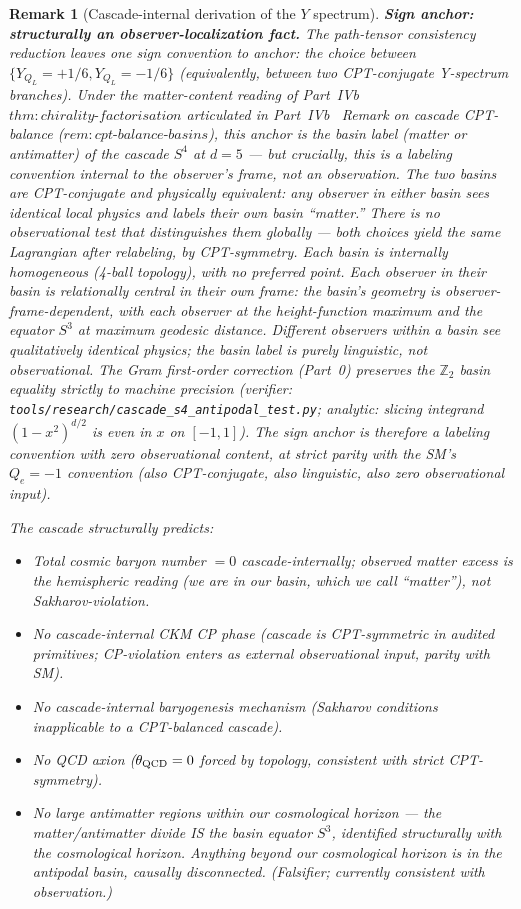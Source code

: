 \documentclass[12pt,a4paper]{article}
\newtheorem{remark}[theorem]{Remark}
\begin{document}
\begin{remark}[Cascade-internal derivation of the $Y$ spectrum]
\medskip\noindent\textbf{Sign anchor: structurally an observer-localization fact.}
The path-tensor consistency reduction leaves one sign convention
to anchor: the choice between $\{Y_{Q_L} = +1/6, Y_{Q_L} = -1/6\}$
(equivalently, between two CPT-conjugate Y-spectrum branches). Under
the matter-content reading of
Part~IVb~\cite{part4b}~$\mathit{thm{:}chirality\text{-}factorisation}$
articulated in Part~IVb~\cite{part4b} Remark on cascade CPT-balance
($\mathit{rem{:}cpt\text{-}balance\text{-}basins}$), this anchor is
the \emph{basin label} (matter or antimatter) of the cascade $S^4$
at $d=5$ --- but crucially, this is \emph{a labeling convention
internal to the observer's frame, not an observation}. The two
basins are CPT-conjugate and physically equivalent: any observer
in either basin sees identical local physics and labels their own
basin ``matter.'' There is no observational test that distinguishes
them globally --- both choices yield the same Lagrangian after
relabeling, by CPT-symmetry. Each basin is internally homogeneous
(4-ball topology), with no preferred point. Each observer in their
basin is \emph{relationally central} in their own frame: the basin's
geometry is observer-frame-dependent, with each observer at the
height-function maximum and the equator $S^3$ at maximum geodesic
distance. Different observers within a basin see qualitatively
identical physics; the basin label is purely linguistic, not
observational. The Gram first-order correction (Part~0)
preserves the $\mathbb{Z}_2$ basin equality strictly to machine
precision (verifier:
\texttt{tools/research/cascade\_s4\_antipodal\_test.py};
analytic: slicing integrand $(1-x^2)^{d/2}$ is even in $x$ on
$[-1,1]$). The sign anchor is therefore \emph{a labeling convention
with zero observational content}, at strict parity with the SM's
$Q_e=-1$ convention (also CPT-conjugate, also linguistic, also
zero observational input).

The cascade structurally predicts:
\begin{itemize}
\item Total cosmic baryon number $=0$ cascade-internally; observed
matter excess is the hemispheric reading (we are in our basin,
which we call ``matter''), not Sakharov-violation.
\item No cascade-internal CKM CP phase (cascade is CPT-symmetric in
audited primitives; CP-violation enters as external observational
input, parity with SM).
\item No cascade-internal baryogenesis mechanism (Sakharov conditions
inapplicable to a CPT-balanced cascade).
\item No QCD axion ($\theta_{\rm QCD}=0$ forced by topology, consistent
with strict CPT-symmetry).
\item No large antimatter regions within our cosmological horizon
--- the matter/antimatter divide IS the basin equator $S^3$,
identified structurally with the cosmological horizon. Anything
beyond our cosmological horizon is in the antipodal basin, causally
disconnected. (Falsifier; currently consistent with observation.)
\end{itemize}


\end{remark}
\end{document}
